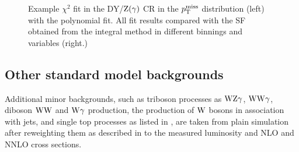 \begin{figure}[tbp]
 \caption{Example $\chi^2$ fit in the DY/$\mathrm{Z}(\gamma)$ CR in the $p_{\mathrm{T}}^\text{miss}$ distribution (left) with the polynomial fit. All fit results compared with the SF obtained from the integral method in different binnings and variables (right.)}
 \label{fig:chiDY}
\end{figure}



\subsection{Other standard model backgrounds}
Additional minor backgrounds, such as triboson processes as $\mathrm{W}\mathrm{Z}\gamma$, $\mathrm{W}\mathrm{W}\gamma$, diboson $\mathrm{W}\mathrm{W}$ and $\mathrm{W}\gamma$ production, the production of $\mathrm{W}$ bosons in association with jets, and single top processes as listed in , are taken from plain simulation after reweighting them as described in  to the measured luminosity and NLO and NNLO cross sections.

\FloatBarrier
